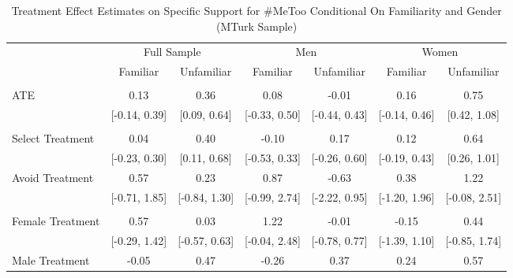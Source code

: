 \documentclass[
]{article}
\begin{document}
\begin{table}[H]

\caption{\label{tab:tabF1}Treatment Effect Estimates on Specific Support for \#MeToo Conditional On Familiarity and Gender (MTurk Sample)}
\centering
\begin{threeparttable}
\begin{tabular}[t]{lcccccc}
\toprule
\multicolumn{1}{c}{ } & \multicolumn{2}{c}{Full Sample} & \multicolumn{2}{c}{Men} & \multicolumn{2}{c}{Women} \\
\cmidrule(l{3pt}r{3pt}){2-3} \cmidrule(l{3pt}r{3pt}){4-5} \cmidrule(l{3pt}r{3pt}){6-7}
  & Familiar & Unfamiliar & Familiar & Unfamiliar & Familiar & Unfamiliar\\
\midrule
\addlinespace[0.3em]
\multicolumn{7}{l}{\textbf{ATE}}\\
\hspace{1em}ATE & 0.13 & 0.36 & 0.08 & -0.01 & 0.16 & 0.75\\
\hspace{1em} & {}[-0.14, 0.39] & {}[0.09, 0.64] & {}[-0.33, 0.50] & {}[-0.44, 0.43] & {}[-0.14, 0.46] & {}[0.42, 1.08]\\
\addlinespace[0.3em]
\multicolumn{7}{l}{\textbf{ACTE}}\\
\hspace{1em}Select Treatment & 0.04 & 0.40 & -0.10 & 0.17 & 0.12 & 0.64\\
\hspace{1em} & {}[-0.23, 0.30] & {}[0.11, 0.68] & {}[-0.53, 0.33] & {}[-0.26, 0.60] & {}[-0.19, 0.43] & {}[0.26, 1.01]\\
\hspace{1em}Avoid Treatment & 0.57 & 0.23 & 0.87 & -0.63 & 0.38 & 1.22\\
\hspace{1em} & {}[-0.71, 1.85] & {}[-0.84, 1.30] & {}[-0.99, 2.74] & {}[-2.22, 0.95] & {}[-1.20, 1.96] & {}[-0.08, 2.51]\\
\addlinespace[0.3em]
\multicolumn{7}{l}{\textbf{CACTE}}\\
\hspace{1em}Female Treatment & 0.57 & 0.03 & 1.22 & -0.01 & -0.15 & 0.44\\
\hspace{1em} & {}[-0.29, 1.42] & {}[-0.57, 0.63] & {}[-0.04, 2.48] & {}[-0.78, 0.77] & {}[-1.39, 1.10] & {}[-0.85, 1.74]\\
\hspace{1em}Male Treatment & -0.05 & 0.47 & -0.26 & 0.37 & 0.24 & 0.57\\

\end{tabular}
\end{threeparttable}
\end{table}
\end{document}
